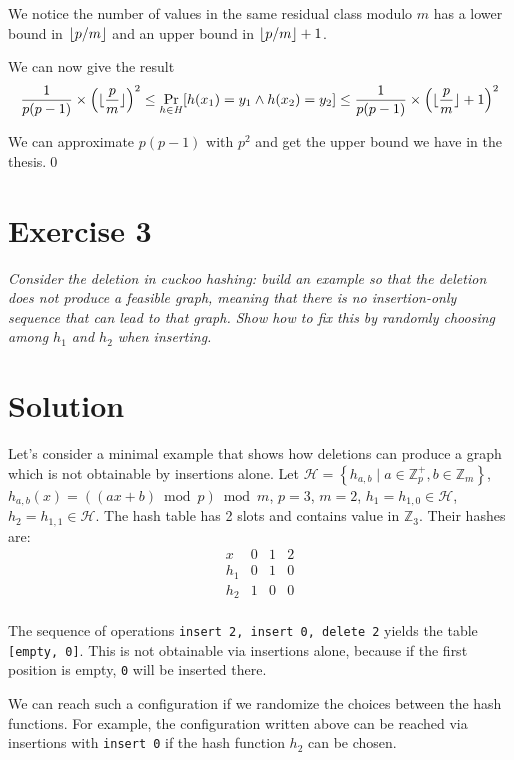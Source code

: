 \documentclass[a4paper, 12pt]{article}
\DeclarePairedDelimiter\floor{\lfloor}{\rfloor}
\begin{document}
We notice the number of values in the same residual class modulo \(m\) has a lower bound in \(\floor{p/m}\)
and an upper bound in \(\floor{p/m} + 1\).

We can now give the result
\[
	\dfrac{1}{p(p-1)} \times \left(\floor{\dfrac{p}{m}}\right)^2 \leq \Pr_{h \in \mathit{H}}[h(x_1) = y_1 \wedge h(x_2) = y_2] \leq \dfrac{1}{p(p-1)} \times \left(\floor{\dfrac{p}{m}} + 1\right)^2
\]

We can approximate \(p(p-1)\) with \(p^2\) and get the upper bound we have in the thesis.\qed

\section{Exercise 3}
{
\itshape{Consider the deletion in cuckoo hashing: build an example so that the deletion does not produce a feasible graph, meaning that there is no insertion-only sequence that can lead to that graph. Show how to fix this by randomly choosing among \(h_1\) and \(h_2\) when inserting.}
}
\section*{Solution}

Let's consider a minimal example that shows how deletions can produce a graph which is not obtainable by insertions alone. Let \(\mathcal H = \left\{ h_{a,b} \mid a \in \mathbb Z_{p}^+, b \in \mathbb Z_{m} \right\}\), \(h_{a,b}(x) = ((ax + b) \bmod p) \bmod m\), \(p=3\), \(m=2\), \(h_1 = h_{1,0} \in \mathcal H\), \(h_2 = h_{1,1} \in \mathcal H\). The hash table has 2 slots and contains value in \(\mathbb Z_{3}\). Their hashes are:
\[\begin{array}{r|c|c|c}
  x & 0 & 1 & 2 \\\hline
  h_1 & 0 & 1 & 0 \\\hline
  h_2 & 1 & 0 & 0 \\
\end{array}\]

The sequence of operations \texttt{insert 2, insert 0, delete 2} yields the table \texttt{[empty, 0]}. This is not obtainable via insertions alone, because if the first position is empty, \texttt{0} will be inserted there.

We can reach such a configuration if we randomize the choices between the hash functions. For example,
the configuration written above can be reached via insertions with \texttt{insert 0} if the hash function
\(h_2\) can be chosen.
\end{document}
